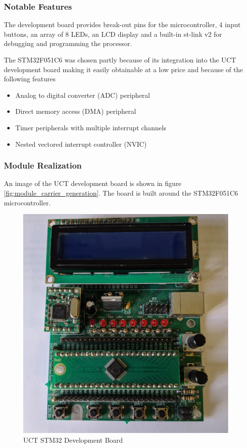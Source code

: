 \subsubsection{Notable Features}

The development board provides break-out pins for the microcontroller, 4 input buttons, an array of 8 LEDs, an LCD display and a built-in st-link v2 for debugging and programming the processor.

The STM32F051C6 was chosen partly because of its integration into the UCT development board making it easily obtainable at a low price and because of the following features

\begin{itemize}
	\item Analog to digital converter (ADC) peripheral
	\item Direct memory access (DMA) peripheral
	\item Timer peripherals with multiple interrupt channels
	\item Nested vectored interrupt controller (NVIC)
\end{itemize}


\subsubsection{Module Realization}
An image of the UCT development board is shown in figure \ref{fig:module_carrier_generation}. The board is built around the STM32F051C6 microcontroller.

\begin{figure}[H]
	\centering
	\includegraphics[width=.5\textwidth]{figures/design/dev_board_image.jpg}
	\caption{UCT STM32 Development Board}
	\label{fig:stm32_dev_board}
\end{figure}



